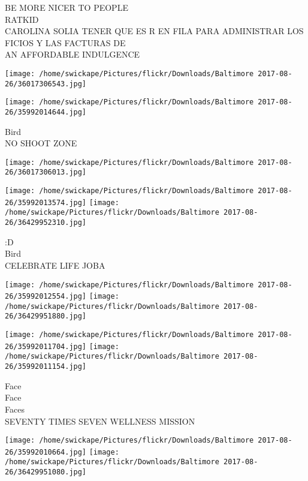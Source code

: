 \documentclass[10pt,letterpaper]{article}
\begin{document}
BE MORE NICER TO PEOPLE\\
RATKID\\
CAROLINA SOLIA TENER QUE ES R EN FILA PARA ADMINISTRAR LOS FICIOS Y LAS FACTURAS DE\\
AN AFFORDABLE INDULGENCE\\
\pagebreak

\texttt{[image: /home/swickape/Pictures/flickr/Downloads/Baltimore 2017-08-26/36017306543.jpg]}

\vspace{0.25in}
\texttt{[image: /home/swickape/Pictures/flickr/Downloads/Baltimore 2017-08-26/35992014644.jpg]}

Bird\\
NO SHOOT ZONE\\
\pagebreak

\texttt{[image: /home/swickape/Pictures/flickr/Downloads/Baltimore 2017-08-26/36017306013.jpg]}

\vspace{0.25in}
\texttt{[image: /home/swickape/Pictures/flickr/Downloads/Baltimore 2017-08-26/35992013574.jpg]}
\texttt{[image: /home/swickape/Pictures/flickr/Downloads/Baltimore 2017-08-26/36429952310.jpg]}

:D\\
Bird\\
CELEBRATE LIFE JOBA\\
\pagebreak

\texttt{[image: /home/swickape/Pictures/flickr/Downloads/Baltimore 2017-08-26/35992012554.jpg]}
\texttt{[image: /home/swickape/Pictures/flickr/Downloads/Baltimore 2017-08-26/36429951880.jpg]}

\texttt{[image: /home/swickape/Pictures/flickr/Downloads/Baltimore 2017-08-26/35992011704.jpg]}
\texttt{[image: /home/swickape/Pictures/flickr/Downloads/Baltimore 2017-08-26/35992011154.jpg]}

Face\\
Face\\
Faces\\
SEVENTY TIMES SEVEN WELLNESS MISSION\\
\pagebreak

\texttt{[image: /home/swickape/Pictures/flickr/Downloads/Baltimore 2017-08-26/35992010664.jpg]}
\texttt{[image: /home/swickape/Pictures/flickr/Downloads/Baltimore 2017-08-26/36429951080.jpg]}
\end{document}
